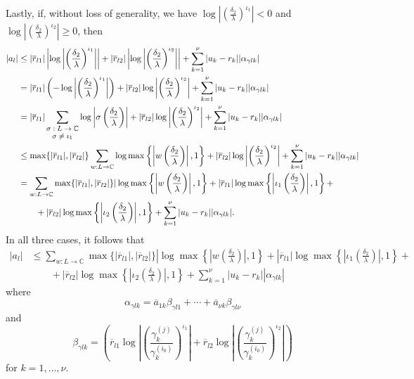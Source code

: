 Lastly, if, without loss of generality, we have $\log\left|\left(\frac{\delta_2}{\lambda}\right)^{\iota_1}\right| < 0$ and $\log\left|\left(\frac{\delta_2}{\lambda}\right)^{\iota_2}\right| \geq 0$, then
\begin{align*}
|a_l| 	& \leq |\overline{r}_{l1}|\left|\log\left|\left(\frac{\delta_2}{\lambda}\right)^{\iota_1}\right|\right| + |\overline{r}_{l2}|\left|\log\left|\left(\frac{\delta_2}{\lambda}\right)^{\iota_2}\right|\right| + \sum_{k=1}^{\nu}|u_k-r_k||\alpha_{\gamma l k}|\\
	& = |\overline{r}_{l1}|\left(-\log\left|\left(\frac{\delta_2}{\lambda}\right)^{\iota_1}\right|\right) + |\overline{r}_{l2}|\log\left|\left(\frac{\delta_2}{\lambda}\right)^{\iota_2}\right| + \sum_{k=1}^{\nu}|u_k-r_k||\alpha_{\gamma l k}|\\
	& = |\overline{r}_{l1}|\sum_{\shortstack{\footnotesize $\sigma: L \to \mathbb{C} $\\ \footnotesize $ \sigma \neq \iota_1$}} \log\left|\sigma \left(\frac{\delta_2}{\lambda}\right)\right|+ |\overline{r}_{l2}|\log\left|\left(\frac{\delta_2}{\lambda}\right)^{\iota_2}\right| + \sum_{k=1}^{\nu}|u_k-r_k||\alpha_{\gamma l k}|\\
	& \leq \max\{|\overline{r}_{l1}|, |\overline{r}_{l2}|\}\sum_{w: L \to \mathbb{C}} \log \max \left\{\left|w\left(\frac{\delta_2}{\lambda}\right)\right|, 1\right\} +  |\overline{r}_{l2}|\log\left|\left(\frac{\delta_2}{\lambda}\right)^{\iota_2}\right| +\sum_{k=1}^{\nu}|u_k-r_k||\alpha_{\gamma l k}|\\
	& = \sum_{w: L \to \mathbb{C}}\max\{|\overline{r}_{l1}|, |\overline{r}_{l2}|\}|\log\max\left\{\left|w\left(\frac{\delta_2}{\lambda}\right)\right|,1\right\} + |\overline{r}_{l1}|\log\max\left\{\left|\iota_1\left(\frac{\delta_2}{\lambda}\right)\right|,1\right\}+ \\
	&\quad\quad + |\overline{r}_{l2}|\log\max\left\{\left|\iota_2\left(\frac{\delta_2}{\lambda}\right)\right|,1\right\}+ \sum_{k=1}^{\nu}|u_k-r_k||\alpha_{\gamma l k}|.
\end{align*}
In all three cases, it follows that
\begin{align*}
|a_l|	& \leq \sum_{w: L \to \mathbb{C}}\max\{|\overline{r}_{l1}|, |\overline{r}_{l2}|\}|\log\max\left\{\left|w\left(\frac{\delta_2}{\lambda}\right)\right|,1\right\} + |\overline{r}_{l1}|\log\max\left\{\left|\iota_1\left(\frac{\delta_2}{\lambda}\right)\right|,1\right\} + \\
	&\quad\quad + |\overline{r}_{l2}|\log\max\left\{\left|\iota_2\left(\frac{\delta_2}{\lambda}\right)\right|,1\right\}+ \sum_{k=1}^{\nu}|u_k-r_k||\alpha_{\gamma l k}|
\end{align*}
where
\[\alpha_{\gamma l k} = \overline{a}_{1k}\beta_{\gamma l 1} + \cdots + \overline{a}_{\nu k}\beta_{\gamma l \nu}\]
and
\[\beta_{\gamma l k} = \left(\overline{r}_{l1} \log\left| \left( \frac{\gamma_k^{(j)}}{\gamma_k^{(i_0)}}\right)^{\iota_1}\right|+ \overline{r}_{l2}\log\left| \left( \frac{\gamma_k^{(j)}}{\gamma_k^{(i_0)}}\right)^{\iota_2}\right|\right)\]
for $k = 1, \dots, \nu$.

